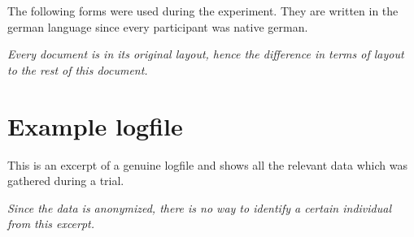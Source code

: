                 The following forms were used during the experiment. They are written in the german language since every participant was native german. 

                \medskip

                \textit{Every document is in its original layout, hence the difference in terms of layout to the rest of this document.}


                \label{consent}
                \label{q-prior}
                \label{q-post}

            \section{Example logfile}\label{logfile}                

                This is an excerpt of a genuine logfile and shows all the relevant data which was gathered during a trial. 
                
                \medskip

                \textit{Since the data is anonymized, there is no way to identify a certain individual from this excerpt.}

